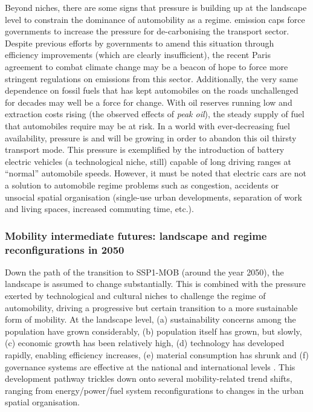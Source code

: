 Beyond niches, there are some signs that pressure is building up at the landscape level to constrain the dominance of automobility as a regime.  emission caps force governments to increase the pressure for de-carbonising the transport sector. Despite previous efforts by governments to amend this situation through efficiency improvements (which are clearly insufficient), the recent Paris agreement to combat climate change may be a beacon of hope to force more stringent regulations on  emissions from this sector. Additionally, the very same dependence on fossil fuels that has kept automobiles on the roads unchallenged for decades may well be a force for change. With oil reserves running low and extraction costs rising (the observed effects of \emph{peak oil}), the steady supply of fuel that automobiles require may be at risk. In a world with ever-decreasing fuel availability, pressure is and will be growing in order to abandon this oil thirsty transport mode. This pressure is exemplified by the introduction of battery electric vehicles (a technological niche, still) capable of long driving ranges at ``normal'' automobile speeds. However, it must be noted that electric cars are not a solution to automobile regime problems such as congestion, accidents or unsocial spatial organisation (single-use urban developments, separation of work and living spaces, increased commuting time, etc.).

\subsubsection*{Mobility intermediate futures: landscape and regime reconfigurations in 2050}
Down the path of the transition to SSP1-MOB (around the year 2050), the landscape is assumed to change substantially. This is combined with the pressure exerted by technological and cultural niches to challenge the regime of automobility, driving a progressive but certain transition to a more sustainable form of mobility. At the landscape level, (a) sustainability concerns among the population have grown considerably, (b) population itself has grown, but slowly, (c) economic growth has been relatively high, (d) technology has developed rapidly, enabling efficiency increases, (e) material consumption has shrunk and (f) governance systems are effective at the national and international levels \parencite{vuuren2017_Energylanduse}. This development pathway trickles down onto several mobility-related trend shifts, ranging from energy/power/fuel system reconfigurations to changes in the urban spatial organisation.

